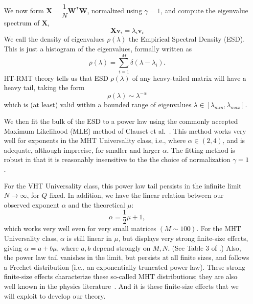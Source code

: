 We now form $\mathbf{X}= \dfrac{1}{N}\mathbf{W}^{T}\mathbf{W}$, normalized using $\gamma=1$, and compute the eigenvalue spectrum of $\mathbf{X}$, 
$$
\mathbf{X}\mathbf{v}_{i}=\lambda_{i}\mathbf{v}_{i}
$$
We call the density of eigenvalues $\rho(\lambda)$ the Empirical Spectral Density (ESD). 
This is just a histogram of the eigenvalues, formally written as
$$
\rho(\lambda)=\sum\limits_{i=1}^{M}\delta(\lambda-\lambda_{i})  .
$$
HT-RMT theory tells us that ESD $\rho(\lambda)$ of any heavy-tailed matrix will have a heavy tail, taking the form
$$
\rho(\lambda)\sim\lambda^{-\alpha}
$$
which is (at least) valid within a bounded range of eigenvalues $\lambda\in[\lambda_{min},\lambda_{max}]$.  

We then fit the bulk of the ESD to a power law using the commonly accepted Maximum Likelihood (MLE) method of Clauset et al.~\cite{CSN09_powerlaw,ABP14}.
This method works very well for exponents in the  MHT Universality class, i.e., where $\alpha\in(2,4)$, and is adequate, although imprecise, for smaller and larger $\alpha$. 
The fitting method is robust in that it is reasonably insensitive to the the choice of normalization $\gamma=1$.



For the VHT Universality class, this power law tail persists in the infinite limit $N\rightarrow\infty$, for $Q$ fixed.
In addition, we have the linear relation between our observed exponent $\alpha$ and the theoretical $\mu$:
$$
\alpha=\dfrac{1}{2}\mu+1  ,
$$
which works very well even for very small matrices $(M\sim100)$.
For the MHT Universality class, $\alpha$ is still linear in $\mu$, but displays very strong finite-size effects, giving $\alpha=a+b\mu$, where $a,b$ depend strongly on $M,N$. 
(See Table 3 of \cite{MM18_TR}.)
Also,  the power law tail vanishes in the limit, but persists at all finite sizes, and follows a Frechet distribution (i.e., an exponentially truncated power law). 
These strong finite-size effects characterize these so-called MHT distributions; they are also well known in the physics literature~\cite{SornetteBook,BouchaudPotters03}. 
And it is these finite-size effects that we will exploit to develop our theory.




